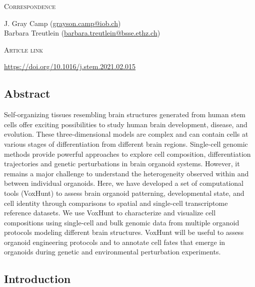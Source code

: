\noindent
{\large\textsc{Correspondence}} 

\noindent
J. Gray Camp (\href{mailto:grayson.camp@iob.ch}{grayson.camp@iob.ch})\\
Barbara Treutlein (\href{mailto:barbara.treutlein@bsse.ethz.ch}{barbara.treutlein@bsse.ethz.ch})

\vspace{1cm}

\noindent
{\large\textsc{Article link}} 

\noindent
\href{https://doi.org/10.1016/j.stem.2021.02.015}{https://doi.org/10.1016/j.stem.2021.02.015}


\subsection{Abstract}

Self-organizing tissues resembling brain structures generated from human stem cells offer exciting possibilities to study human brain development, disease, and evolution. These three-dimensional models are complex and can contain cells at various stages of differentiation from different brain regions. Single-cell genomic methods provide powerful approaches to explore cell composition, differentiation trajectories and genetic perturbations in brain organoid systems. However, it remains a major challenge to understand the heterogeneity observed within and between individual organoids. Here, we have developed a set of computational tools (VoxHunt) to assess brain organoid patterning, developmental state, and cell identity through comparisons to spatial and single-cell transcriptome reference datasets. We use VoxHunt to characterize and visualize cell compositions using single-cell and bulk genomic data from multiple organoid protocols modeling different brain structures. VoxHunt will be useful to assess organoid engineering protocols and to annotate cell fates that emerge in organoids during genetic and environmental perturbation experiments.


\subsection{Introduction}

